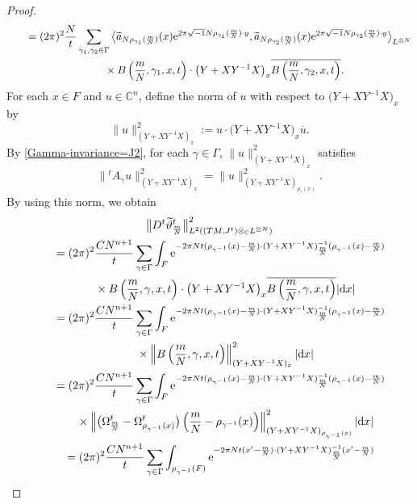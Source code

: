 \documentclass[10pt,a4paper]{amsart}
\numberwithin{equation}{section}
\newcommand{\C}{\mathbb{C}}
\renewcommand{\tilde}{\widetilde}
\newcommand{\abs}[1]{\lvert#1\rvert}
\newcommand{\norm}[1]{\lVert#1\rVert}
\begin{document}
\begin{proof}
\begin{gather*}
\qquad=(2\pi)^2\frac{N}{t}\sum_{\gamma_1, \gamma_2 \in \Gamma}\big\langle {\tilde a}_{N\rho_{\gamma_1}(\frac{m}{N})}(x){\rm e}^{2\pi\sqrt{-1}N\rho_{\gamma_1} (\frac{m}{N})\cdot y}, {\tilde a}_{N\rho_{\gamma_2}(\frac{m}{N})}(x){\rm e}^{2\pi\sqrt{-1}N\rho_{\gamma_2} (\frac{m}{N})\cdot y}\big\rangle_{L^{\otimes N}}\\
\phantom{\qquad=}{} \times B\left(\frac{m}{N}, \gamma_1 ,x,t\right)\cdot \bigl(Y+XY^{-1}X\bigr)_x \overline{ B\left(\frac{m}{N}, \gamma_2 ,x,t\right)}.
\end{gather*}
For each $x\in F$ and $u\in \C^n$, define the norm of $u$ with respect to $\bigl(Y+XY^{-1}X\bigr)_x$ by
\[
\norm{u}^2_{(Y+XY^{-1}X)_x}:=u\cdot \bigl(Y+XY^{-1}X\bigr)_x\overline{u}.
\]
By \eqref{Gamma-invariance=J2}, for each $\gamma \in \Gamma$, $\norm{u}^2_{(Y+XY^{-1}X)_x}$ satisfies
\[
\big\|{}^tA_{\gamma}u\big\|^2_{(Y+XY^{-1}X)_x}=\norm{u}^2_{(Y+XY^{-1}X)_{\rho_\gamma (x)}}.
\]
By using this norm, we obtain
\begin{gather*}%
\big\|D^t {\tilde \vartheta}^t_{\frac{m}{N}}\big\|_{L^2((TM, J^t)\otimes_{\C}L^{\otimes N})}^2 \\
\qquad=(2\pi)^2\frac{C N^{n+1}}{t}\sum_{\gamma \in \Gamma}\int_F {\rm e}^{-2\pi Nt(\rho_{\gamma^{-1}}(x)-\frac{m}{N})\cdot ( Y+XY^{-1}X)^{-1}_{\frac{m}{N}}(\rho_{\gamma^{-1}}(x)-\frac{m}{N})} \\
\phantom{\qquad=}{} \times B\left(\frac{m}{N}, \gamma ,x,t\right)\cdot \bigl(Y+XY^{-1}X\bigr)_x \overline{ B\left(\frac{m}{N}, \gamma ,x,t\right)}\abs{{\rm d}x}\nonumber %
\\
\qquad=(2\pi)^2\frac{C N^{n+1}}{t}\sum_{\gamma \in \Gamma}\int_F {\rm e}^{-2\pi Nt(\rho_{\gamma^{-1}}(x)-\frac{m}{N})\cdot ( Y+XY^{-1}X)^{-1}_{\frac{m}{N}}(\rho_{\gamma^{-1}}(x)-\frac{m}{N})} \\
\phantom{\qquad=}{} \times \left\lVert B\left(\frac{m}{N}, \gamma ,x,t\right)\right\rVert^2_{(Y+XY^{-1}X)_x}\abs{{\rm d}x} \\
\qquad=(2\pi)^2\frac{C N^{n+1}}{t}\sum_{\gamma \in \Gamma}\int_F {\rm e}^{-2\pi Nt(\rho_{\gamma^{-1}}(x)-\frac{m}{N})\cdot ( Y+XY^{-1}X)^{-1}_{\frac{m}{N}}(\rho_{\gamma^{-1}}(x)-\frac{m}{N})} \\
\phantom{\qquad=}{} \times \left\lVert \bigl( \Omega^t_{\frac{m}{N}}-\Omega^t_{\rho_{\gamma^{-1}}(x)}\bigr)\left(\frac{m}{N}-\rho_{\gamma^{-1}}(x)\right)\right\rVert^2_{(Y+XY^{-1}X)_{\rho_{\gamma^{-1}}(x)}}\abs{{\rm d}x} \\
\qquad= (2\pi)^2\frac{C N^{n+1}}{t}\sum_{\gamma \in \Gamma}\int_{\rho_{\gamma^{-1}}(F)} {\rm e}^{-2\pi Nt(x'-\frac{m}{N})\cdot ( Y+XY^{-1}X)^{-1}_{\frac{m}{N}}(x'-\frac{m}{N})} \\

\end{gather*}
\end{proof}
\end{document}
